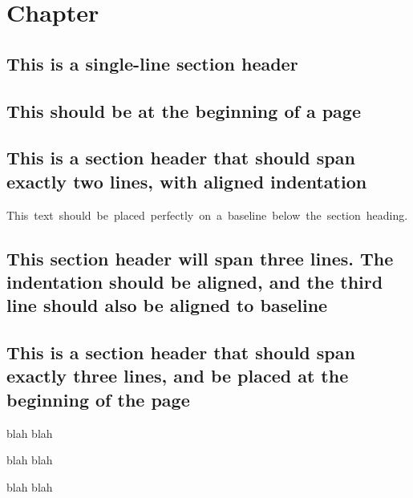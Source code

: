 \documentclass[baselinegrid,noprint,nocopyright]{uit-thesis}
\begin{document}
\frontmatter

\begin{abstract}
\lipsum
\end{abstract}

\begin{acknowledgement}
\lipsum
\end{acknowledgement}

\tableofcontents

\mainmatter

\chapter{Chapter}
\lipsum[1]

\section{This is a single-line section header}
\lipsum[3-7]

\section{This should be at the beginning of a page}
\lipsum[8]

\section{This is a section header that should span exactly two lines, with aligned indentation}
\mbox{This~text~should~be~placed~perfectly~on~a~baseline~below~the~section~heading.}

\lipsum[9]

\section{This section header will span three lines. The indentation should be aligned, and the third line should also be aligned to baseline}
\lipsum[10-14]

\section{This is a section header that should span exactly three lines, and be placed at the beginning of the page}

\lipsum[15-17]

blah blah

blah blah

blah blah
\end{document}
